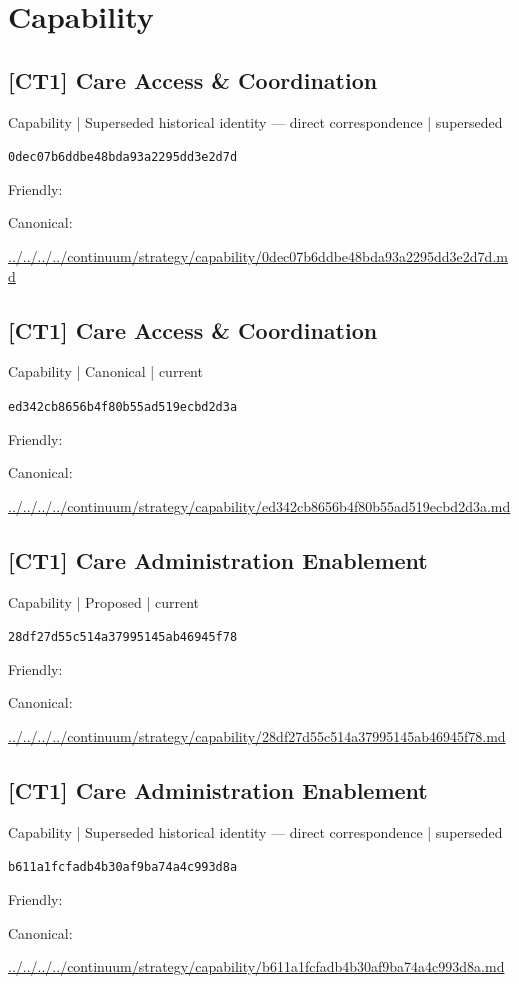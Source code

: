 \documentclass[10pt,a4paper]{article}
\begin{document}
\section*{Capability}
\subsection*{[CT1] Care Access \& Coordination}
{\small Capability | Superseded historical identity — direct correspondence | superseded}\par
\texttt{0dec07b6ddbe48bda93a2295dd3e2d7d}\par
Friendly: \par
Canonical: \par
{\footnotesize\url{../../../../continuum/strategy/capability/0dec07b6ddbe48bda93a2295dd3e2d7d.md}}\par
\subsection*{[CT1] Care Access \& Coordination}
{\small Capability | Canonical | current}\par
\texttt{ed342cb8656b4f80b55ad519ecbd2d3a}\par
Friendly: \par
Canonical: \par
{\footnotesize\url{../../../../continuum/strategy/capability/ed342cb8656b4f80b55ad519ecbd2d3a.md}}\par
\subsection*{[CT1] Care Administration Enablement}
{\small Capability | Proposed | current}\par
\texttt{28df27d55c514a37995145ab46945f78}\par
Friendly: \par
Canonical: \par
{\footnotesize\url{../../../../continuum/strategy/capability/28df27d55c514a37995145ab46945f78.md}}\par
\subsection*{[CT1] Care Administration Enablement}
{\small Capability | Superseded historical identity — direct correspondence | superseded}\par
\texttt{b611a1fcfadb4b30af9ba74a4c993d8a}\par
Friendly: \par
Canonical: \par
{\footnotesize\url{../../../../continuum/strategy/capability/b611a1fcfadb4b30af9ba74a4c993d8a.md}}\par
\end{document}
